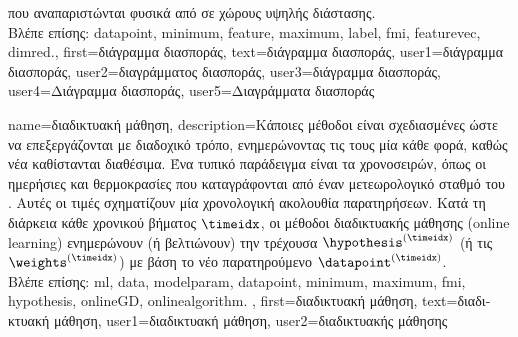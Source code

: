 {{		\foreignlanguage{greek}{που αναπαριστώνται φυσικά από}  
		\foreignlanguage{greek}{σε χώρους υψηλής διάστασης.}
		\\
		 \foreignlanguage{greek}{Βλέπε επίσης:} \gls{datapoint}, \gls{minimum}, \gls{feature}, \gls{maximum}, \gls{label}, \gls{fmi}, 
		 \gls{featurevec}, \gls{dimred}.},
	first={\foreignlanguage{greek}{διάγραμμα διασποράς}},
	text={\foreignlanguage{greek}{διάγραμμα διασποράς}},
	user1={\foreignlanguage{greek}{διάγραμμα διασποράς}}, %
  	user2={\foreignlanguage{greek}{διαγράμματος διασποράς}}, %
	user3={\foreignlanguage{greek}{διάγραμμα διασποράς}}, %
	user4={\foreignlanguage{greek}{Διάγραμμα διασποράς}}, %
	user5={\foreignlanguage{greek}{Διαγράμματα διασποράς}} %
}

{name={\foreignlanguage{greek}{διαδικτυακή μάθηση}},
	description={\foreignlanguage{greek}{Κάποιες μέθοδοι}  
		\foreignlanguage{greek}{είναι σχεδιασμένες ώστε να επεξεργάζονται}  \foreignlanguage{greek}{με διαδοχικό τρόπο, 
		ενημερώνοντας τις}  \foreignlanguage{greek}{τους μία κάθε φορά, καθώς νέα}  
		\foreignlanguage{greek}{καθίστανται διαθέσιμα. Ένα τυπικό παράδειγμα είναι τα}  \foreignlanguage{greek}{χρονοσειρών, 
		όπως οι ημερήσιες}  \foreignlanguage{greek}{και}  \foreignlanguage{greek}{θερμοκρασίες 
		που καταγράφονται από έναν μετεωρολογικό σταθμό του} . \foreignlanguage{greek}{Αυτές οι τιμές σχηματίζουν μία
		χρονολογική ακολουθία παρατηρήσεων. Κατά τη διάρκεια κάθε χρονικού βήματος $\timeidx$, οι μέθοδοι διαδικτυακής μάθησης}
		(online learning) \foreignlanguage{greek}{ενημερώνουν (ή βελτιώνουν) την τρέχουσα}  
		$\hypothesis^{(\timeidx)}$ (\foreignlanguage{greek}{ή τις}  $\weights^{(\timeidx)}$) 
		\foreignlanguage{greek}{με βάση το νέο παρατηρούμενο}  $\datapoint^{(\timeidx)}$. 
		\\ 
		\foreignlanguage{greek}{Βλέπε επίσης:} \gls{ml}, \gls{data}, \gls{modelparam}, \gls{datapoint}, \gls{minimum}, \gls{maximum}, \gls{fmi}, 
		\gls{hypothesis}, \gls{onlineGD}, \gls{onlinealgorithm}.  },
	first={\foreignlanguage{greek}{διαδικτυακή μάθηση}},
	text={\foreignlanguage{greek}{διαδικτυακή μάθηση}},
	user1={\foreignlanguage{greek}{διαδικτυακή μάθηση}}, %
  	user2={\foreignlanguage{greek}{διαδικτυακής μάθησης}} %
}


